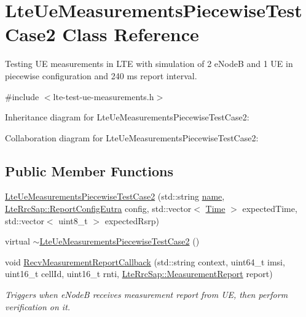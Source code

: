 \hypertarget{classLteUeMeasurementsPiecewiseTestCase2}{}\section{Lte\+Ue\+Measurements\+Piecewise\+Test\+Case2 Class Reference}
\label{classLteUeMeasurementsPiecewiseTestCase2}


Testing UE measurements in L\+TE with simulation of 2 e\+NodeB and 1 UE in piecewise configuration and 240 ms report interval.  




{\ttfamily \#include $<$lte-\/test-\/ue-\/measurements.\+h$>$}



Inheritance diagram for Lte\+Ue\+Measurements\+Piecewise\+Test\+Case2\+:


Collaboration diagram for Lte\+Ue\+Measurements\+Piecewise\+Test\+Case2\+:
\subsection*{Public Member Functions}
\begin{DoxyCompactItemize}
\item 
\hyperlink{classLteUeMeasurementsPiecewiseTestCase2_a79e021f7305bb2fa3bcb6ae8e26daf40}{Lte\+Ue\+Measurements\+Piecewise\+Test\+Case2} (std\+::string \hyperlink{generate__test__data__lte__spectrum__model_8m_ab74e6bf80237ddc4109968cedc58c151}{name}, \hyperlink{structns3_1_1LteRrcSap_1_1ReportConfigEutra}{Lte\+Rrc\+Sap\+::\+Report\+Config\+Eutra} config, std\+::vector$<$ \hyperlink{classns3_1_1Time}{Time} $>$ expected\+Time, std\+::vector$<$ uint8\+\_\+t $>$ expected\+Rsrp)
\item 
virtual \hyperlink{classLteUeMeasurementsPiecewiseTestCase2_acce908be9ace48462e50f821dece3988}{$\sim$\+Lte\+Ue\+Measurements\+Piecewise\+Test\+Case2} ()
\item 
void \hyperlink{classLteUeMeasurementsPiecewiseTestCase2_ab39f5db572c10fb73def61678fd38940}{Recv\+Measurement\+Report\+Callback} (std\+::string context, uint64\+\_\+t imsi, uint16\+\_\+t cell\+Id, uint16\+\_\+t rnti, \hyperlink{structns3_1_1LteRrcSap_1_1MeasurementReport}{Lte\+Rrc\+Sap\+::\+Measurement\+Report} report)
\begin{DoxyCompactList}\small\item\em Triggers when e\+NodeB receives measurement report from UE, then perform verification on it. \end{DoxyCompactList}\end{DoxyCompactItemize}
